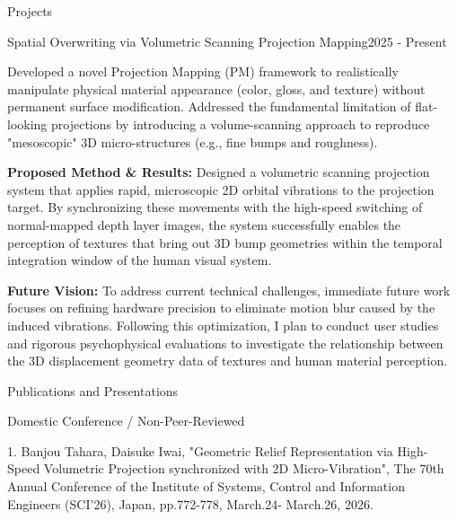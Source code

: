 \documentclass{resume} %
\begin{document}
\begin{rSection}{Projects}

  \begin{rSubsection}{Spatial Overwriting via Volumetric Scanning Projection Mapping}{2025 - Present}{}{}
    \item Developed a novel Projection Mapping (PM) framework to realistically manipulate physical material appearance (color, gloss, and texture) without permanent surface modification. Addressed the fundamental limitation of flat-looking projections by introducing a volume-scanning approach to reproduce "mesoscopic" 3D micro-structures (e.g., fine bumps and roughness).
    \smallskip

    \item \textbf{Proposed Method \& Results:} Designed a volumetric scanning projection system that applies rapid, microscopic 2D orbital vibrations to the projection target. By synchronizing these movements with the high-speed switching of normal-mapped depth layer images, the system successfully enables the perception of textures that bring out 3D bump geometries within the temporal integration window of the human visual system.

    \item \textbf{Future Vision:} To address current technical challenges, immediate future work focuses on refining hardware precision to eliminate motion blur caused by the induced vibrations. Following this optimization, I plan to conduct user studies and rigorous psychophysical evaluations to investigate the relationship between the 3D displacement geometry data of textures and human material perception.
  \end{rSubsection}

\end{rSection}




\begin{rSection}{Publications and Presentations}

  \begin{rSubsection}{Domestic Conference / Non-Peer-Reviewed}{}{}{}
    \item 1. Banjou Tahara, Daisuke Iwai, "Geometric Relief Representation via High-Speed Volumetric Projection synchronized with 2D Micro-Vibration", The 70th Annual Conference of the Institute of Systems, Control and Information Engineers (SCI'26), Japan, pp.772-778, March.24- March.26, 2026.
  \end{rSubsection}

\end{rSection}
\end{document}
